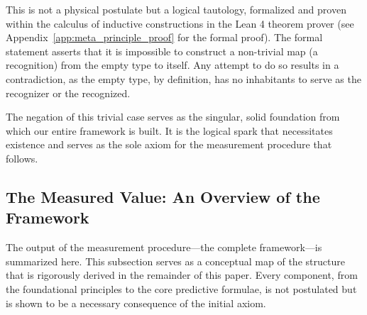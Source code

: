 This is not a physical postulate but a logical tautology, formalized and proven within the calculus of inductive constructions in the Lean 4 theorem prover (see Appendix~\ref{app:meta_principle_proof} for the formal proof). The formal statement asserts that it is impossible to construct a non-trivial map (a recognition) from the empty type to itself. Any attempt to do so results in a contradiction, as the empty type, by definition, has no inhabitants to serve as the recognizer or the recognized.

The negation of this trivial case serves as the singular, solid foundation from which our entire framework is built. It is the logical spark that necessitates existence and serves as the sole axiom for the measurement procedure that follows.

\subsection{The Measured Value: An Overview of the Framework}
The output of the measurement procedure—the complete framework—is summarized here. This subsection serves as a conceptual map of the structure that is rigorously derived in the remainder of this paper. Every component, from the foundational principles to the core predictive formulae, is not postulated but is shown to be a necessary consequence of the initial axiom.

